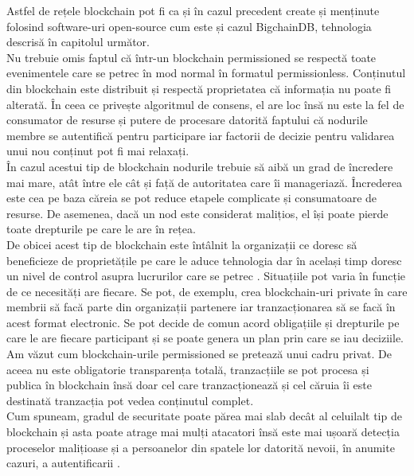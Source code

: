 \begin{enumerate}
    Astfel de rețele blockchain pot fi ca și în cazul precedent create și menținute folosind software-uri open-source cum este și cazul BigchainDB, tehnologia descrisă în capitolul următor.\\
    
    Nu trebuie omis faptul că într-un blockchain permissioned se respectă toate evenimentele care se petrec în mod normal în formatul permissionless. Conținutul din blockchain este distribuit și respectă proprietatea că informația nu poate fi alterată. În ceea ce privește algoritmul de consens, el are loc însă nu este la fel de consumator de resurse și putere de procesare datorită faptului că nodurile membre se autentifică pentru participare iar factorii de decizie pentru validarea unui nou conținut pot fi mai relaxați.\\
    
    În cazul acestui tip de blockchain nodurile trebuie să aibă un grad de încredere mai mare, atât între ele cât și față de autoritatea care îi manageriază. Încrederea este cea pe baza căreia se pot reduce etapele complicate și consumatoare de resurse. De asemenea, dacă un nod este considerat malițios, el își poate pierde toate drepturile pe care le are în rețea.\\
    
    De obicei acest tip de blockchain este întâlnit la organizații ce doresc să beneficieze de proprietățile pe care le aduce tehnologia dar în același timp doresc un nivel de control asupra lucrurilor care se petrec \cite{Blockchain_Overview_NIST}. Situațiile pot varia în funcție de ce necesități are fiecare. Se pot, de exemplu, crea blockchain-uri private în care membrii să facă parte din organizații partenere iar tranzacționarea să se facă în acest format electronic. Se pot decide de comun acord obligațiile și drepturile pe care le are fiecare participant și se poate genera un plan prin care se iau deciziile.\\
    
    Am văzut cum blockchain-urile permissioned se pretează unui cadru privat. De aceea nu este obligatorie transparența totală, tranzacțiile se pot procesa și publica în blockchain însă doar cel care tranzacționează și cel căruia îi este destinată tranzacția pot vedea conținutul complet.\\
    
    Cum spuneam, gradul de securitate poate părea mai slab decât al celuilalt tip de blockchain și asta poate atrage mai mulți atacatori însă este mai ușoară detecția proceselor malițioase și a persoanelor din spatele lor datorită nevoii, în anumite cazuri, a autentificarii \cite{Blockchain_Overview_NIST}.\\
    
\end{enumerate}

